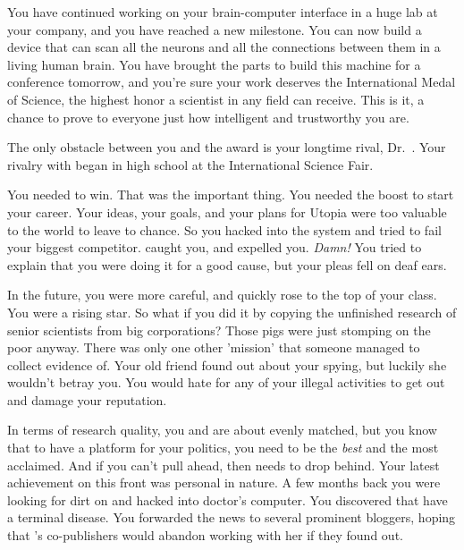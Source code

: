 \documentclass[char]{guildcamp1}
\begin{document}
You have continued working on your brain-computer interface in a huge lab at your company, and you have reached a new milestone.  You can now build a device that can scan all the neurons and all the connections between them in a living human brain.  You have brought the parts to build this machine for a conference tomorrow, and you're sure your work deserves the International Medal of Science, the highest honor a scientist in any field can receive.  This is it, a chance to prove to everyone just how intelligent and trustworthy you are.

The only obstacle between you and the award is your longtime rival, Dr.~\cScientist{\intro}.  Your rivalry with \cScientist{} began in high school at the International Science Fair.  %

You needed to win. That was the important thing. You needed the boost to start your career. Your ideas, your goals, and your plans for Utopia were too valuable to the world to leave to chance. So you hacked into the system and tried to fail your biggest competitor. \cScientist{} caught you, and expelled you. \emph{Damn!} You tried to explain that you were doing it for a good cause, but your pleas fell on deaf ears.

In the future, you were more careful, and quickly rose to the top of your class. You were a rising star. So what if you did it by copying the unfinished research of senior scientists from big corporations? Those pigs were just stomping on the poor anyway. There was only one other 'mission' that someone managed to collect evidence of.  Your old friend \cBride{} found out about your spying, but luckily she wouldn't betray you.  You would hate for any of your illegal activities to get out and damage your reputation.

In terms of research quality, you and \cScientist{} are about evenly matched, but you know that to have a platform for your politics, you need to be the \emph{best} and the most acclaimed. And if you can't pull ahead, then \cScientist{} needs to drop behind. Your latest achievement on this front was personal in nature. A few months back you were looking for dirt on \cScientist{} and hacked into \cScientist{\Their} doctor's computer. You discovered that \cScientist{\They{}} have a terminal disease. You forwarded the news to several prominent bloggers, hoping that \cScientist{}'s co-publishers would abandon working with her if they found out.
\end{document}
